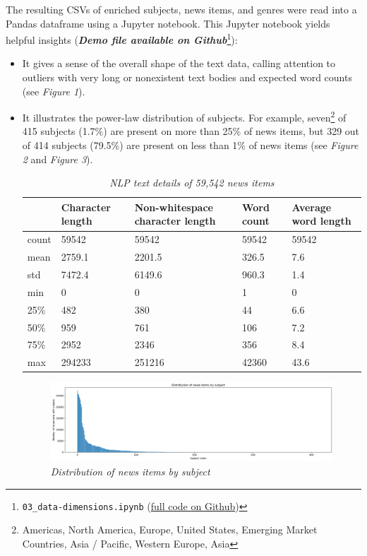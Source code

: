 \documentclass[11pt]{article}
\begin{document}
    The resulting CSVs of enriched subjects, news items, and genres were read into a Pandas dataframe using a Jupyter notebook. This Jupyter notebook yields helpful insights (\textit{\textbf{Demo file available on Github}}\footnote{\lstinline{03_data-dimensions.ipynb} (\href{https://github.com/Birkbeck/msc-data-science-project-2020_21---files-heychrisek/}{full code on Github})}):
    \begin{itemize}
      \item{It gives a sense of the overall shape of the text data, calling attention to outliers with very long or nonexistent text bodies and expected word counts (see \textit{Figure 1}).}

      \item{It illustrates the power-law distribution of subjects. For example, seven\footnote{Americas, North America, Europe, United States, Emerging Market Countries, Asia / Pacific, Western Europe, Asia} of 415 subjects (1.7\%) are present on more than 25\% of news items, but 329 out of 414 subjects (79.5\%) are present on less than 1\% of news items (see \textit{Figure 2} and \textit{Figure 3}).

      \begin{table}
        \begin{tabular}{ |p{1cm}|p{2.25cm}|p{2.25cm}|p{2.25cm}|p{2.25cm}|  }
        \hline
        &Character length&Non-whitespace character length&Word count&Average word length\\
        \hline
        count&59542&59542&59542&59542\\
        mean&2759.1&2201.5&326.5&7.6\\
        std&7472.4&6149.6&960.3&1.4\\
        min&0&0&1&0\\
        25\%&482&380&44&6.6\\
        50\%&959&761&106&7.2\\
        75\%&2952&2346&356&8.4\\
        max&294233&251216&42360&43.6\\
        \hline
        \end{tabular}
        \caption{\textit{NLP text details of 59,542 news items}}
      \end{table}

      \begin{figure}
        \centerline{\includegraphics[scale=0.35]{distribution_news_item_subject}}
        \caption{\textit{Distribution of news items by subject}}
      \end{figure}

}
\end{itemize}
\end{document}
